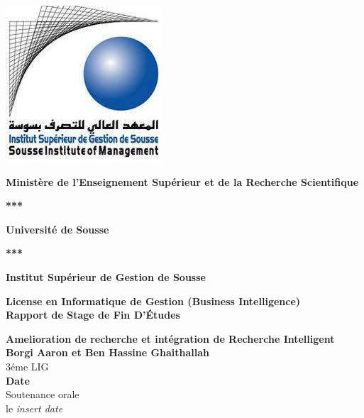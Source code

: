 \begin{titlepage}
    \begin{center}
        \includegraphics[width=.50\textwidth]{logos/isgs.png}
    
        \vspace*{0.5cm}
        \large
        \textbf{Ministère de l'Enseignement Supérieur et de la Recherche Scientifique}
        
        \vspace*{0.3cm}
        \textbf{***}

        \vspace*{0.3cm}
        \textbf{Université de Sousse}

        \vspace*{0.3cm}
        \textbf{***}

        \vspace{0.3cm}
        \textbf{Institut Supérieur de Gestion de Sousse}

        \vspace{0.3cm}
        \large
        \vspace*{0.3cm}
        \textbf{License en Informatique de Gestion (Business Intelligence)}\\

        \vspace*{0.3cm}
        \textbf{Rapport de Stage de Fin D'Études}

        \large
        \vspace*{0.3cm}
        \textbf{Amelioration de recherche et intégration de Recherche Intelligent}\\
            
        \vspace{1cm}
        \large
        \textbf{Borgi Aaron et Ben Hassine Ghaithallah}\\
        3éme LIG\\
        \vspace{0.5cm}
        \large
        \textbf{Date}\\
        Soutenance orale\\
        le \textit{insert date}
            

\end{center}
\end{titlepage}
